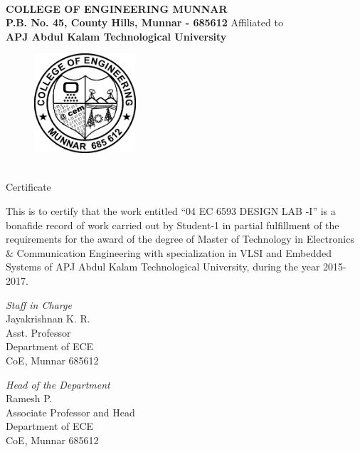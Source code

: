 \newlength{\toptafiddle} 
\newlength{\bottafiddle}
%
\setlength{\toptafiddle}{1in}
\setlength{\bottafiddle}{1in}
\vspace*{-0.5in}
\enlargethispage{\bottafiddle}
\thispagestyle{empty}

\begin{center}\large \\\textbf{\Large COLLEGE OF ENGINEERING MUNNAR}\\ \textbf{\Large P.B. No. 45, County Hills, Munnar - 685612} \vfill
 Affiliated to\\
\textbf{APJ Abdul Kalam  Technological University}\\
\vspace{0.2cm}
\begin{figure}[h]
\centering
\includegraphics[height=3.7cm]{images/cem1.png}
\end{figure}\\
\Huge{Certificate}\end{center}

This is to certify that the work entitled ``04 EC 6593 DESIGN LAB -I'' is a bonafide record of work carried out by Student-1 in partial fulfillment of the requirements for the  award of the degree of Master of Technology in Electronics \& Communication Engineering with specialization in VLSI and Embedded Systems of APJ Abdul Kalam Technological University, during the year 2015-2017. 

\vfill
\begin{minipage}[t]{0.5\textwidth}%
\emph{Staff in Charge}\\
Jayakrishnan K. R. \\
Asst. Professor\\
Department of ECE\\
CoE, Munnar 685612
\end{minipage}\hspace{2cm}
\begin{minipage}[t]{0.4\textwidth}%
{\emph{Head of the Department}}\\
Ramesh P. \\
Associate Professor and Head\\
Department of ECE\\
CoE, Munnar 685612
\end{minipage}

